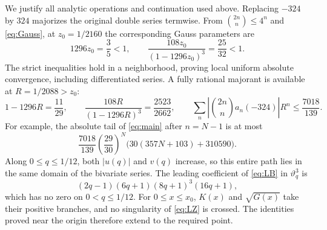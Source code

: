 \documentclass[11pt,a4paper]{article}
\theoremstyle{remark}
\newcommand{\tht}{\vartheta}
\begin{document}
We justify all analytic operations and continuation used above.
Replacing $-324$ by $324$ majorizes the original double series
termwise. From $\binom{2n}{n}\leq4^n$ and \eqref{eq:Gauss}, at
$z_0=1/2160$ the corresponding Gauss parameters are
\[
 1296z_0=\frac35<1,\qquad
 \frac{108z_0}{(1-1296z_0)^3}=\frac{25}{32}<1.
\]
The strict inequalities hold in a neighborhood, proving local uniform
absolute convergence, including differentiated series. A fully rational
majorant is available at $R=1/2088>z_0$:
\[
 1-1296R=\frac{11}{29},\qquad
 \frac{108R}{(1-1296R)^3}=\frac{2523}{2662},\qquad
 \sum_n\left|\binom{2n}{n}a_n(-324)\right|R^n
       \leq\frac{7018}{139}.
\]
For example, the absolute tail of \eqref{eq:main} after $n=N-1$ is at most
\[
 \frac{7018}{139}\left(\frac{29}{30}\right)^N
                 \bigl(30(357N+103)+310590\bigr).
\]
Along $0\leq q\leq1/12$, both $|u(q)|$ and $v(q)$ increase, so this
entire path lies in the same domain of the bivariate series. The leading
coefficient of \eqref{eq:LB} in $\tht_q^3$ is
\[
 (2q-1)(6q+1)(8q+1)^3(16q+1),
\]
which has no zero on $0<q\leq1/12$. For $0\leq x\leq x_0$,
$K(x)$ and $\sqrt{G(x)}$ take their positive branches, and no singularity
of \eqref{eq:LZ} is crossed. The identities proved near the origin
therefore extend to the required point.
\end{document}
